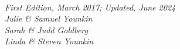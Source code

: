 \begin{titlepage}
\vspace*{1.5in}
\begin{center}
\\
\vspace{1em}
\large{\itshape First Edition, March 2017; Updated, June 2024}\\
\vspace*{2em}
\Large{\slshape Julie \& Samuel Younkin}\\
\vspace*{0.5em}
\Large{\slshape Sarah \& Judd Goldberg}\\
\vspace*{0.5em}
\Large{\slshape Linda \& Steven Younkin}\\




\end{center}

\end{titlepage}
